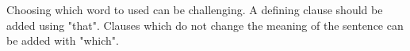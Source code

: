 \documentclass{article}
\begin{document}
Choosing which word to used can be challenging. 
A defining clause should be added using "that".
Clauses which do not change the meaning of the sentence can be added with "which". 
\end{document}
